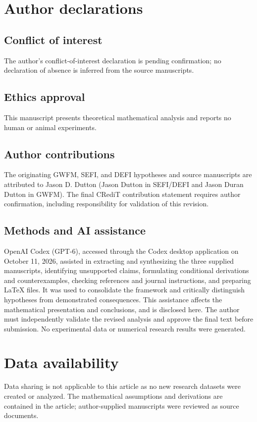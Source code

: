 \documentclass[aip,jmp,reprint,onecolumn,amsmath,amssymb]{revtex4-2}
\begin{document}
\section*{Author declarations}
\subsection*{Conflict of interest}
The author's conflict-of-interest declaration is pending confirmation; no declaration of absence is inferred from the source manuscripts.
\subsection*{Ethics approval}
This manuscript presents theoretical mathematical analysis and reports no human or animal experiments.
\subsection*{Author contributions}
The originating GWFM, SEFI, and DEFI hypotheses and source manuscripts are attributed to Jason D. Dutton (Jason Dutton in SEFI/DEFI and Jason Duran Dutton in GWFM). The final CRediT contribution statement requires author confirmation, including responsibility for validation of this revision.
\subsection*{Methods and AI assistance}
OpenAI Codex (GPT-6), accessed through the Codex desktop application on October 11, 2026, assisted in extracting and synthesizing the three supplied manuscripts, identifying unsupported claims, formulating conditional derivations and counterexamples, checking references and journal instructions, and preparing \LaTeX{} files. It was used to consolidate the framework and critically distinguish hypotheses from demonstrated consequences. This assistance affects the mathematical presentation and conclusions, and is disclosed here. The author must independently validate the revised analysis and approve the final text before submission. No experimental data or numerical research results were generated.
\section*{Data availability}
Data sharing is not applicable to this article as no new research datasets were created or analyzed. The mathematical assumptions and derivations are contained in the article; author-supplied manuscripts were reviewed as source documents.

\end{document}
